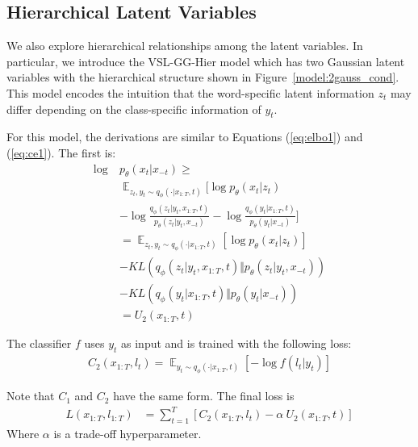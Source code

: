 \documentclass[11pt,a4paper]{article}
\newcommand{\vsmgghier}{VSL-GG-Hier\xspace}
\begin{document}
\subsection{Hierarchical Latent Variables}

We also explore hierarchical relationships among the latent variables.
In particular, we introduce the \vsmgghier model which has two Gaussian latent variables with the  hierarchical structure shown in Figure~\ref{model:2gauss_cond}. This model encodes the intuition that the word-specific latent information $z_t$ may differ depending on the class-specific information of $y_t$.

For this model, the derivations are similar to Equations (\ref{eq:elbo1}) and (\ref{eq:ce1}). The first is:
\begin{equation}
\begin{aligned}
    \log~&p_\theta(x_t\vert x_{-t})\geq\\
    &\mathop\mathbb{E}_{z_t,y_t\sim q_\phi(\cdot\vert x_{1:T},t)}[\log p_\theta(x_t\vert z_t) \\&-\log\frac{q_\phi(z_t\vert y_t,x_{1:T},t)}{p_\theta(z_t\vert y_t,x_{-t})}
    -\log\frac{q_\phi(y_t\vert x_{1:T},t)}{p_\theta(y_t\vert x_{-t})} ]\\
    &=\mathop\mathbb{E}_{z_t,y_t\sim q_\phi(\cdot\vert x_{1:T},t)}[\log p_\theta(x_t\vert z_t)]\\
    &-KL(q_\phi(z_t\vert y_t,x_{1:T},t)\Vert p_\theta(z_t\vert y_t,x_{-t}))\\
    &-KL(q_\phi(y_t\vert x_{1:T},t)\Vert p_\theta(y_t\vert x_{-t}))\\
    &=U_2(x_{1:T},t)
\end{aligned}
\label{eq:elbo2}
\end{equation}

\noindent The classifier $f$ uses $y_t$ as input and is trained with the following loss:
\begin{equation}
\begin{aligned}
C_2(x_{1:T}, l_{t}) = \mathop\mathbb{E}_{y_t\sim q_\phi(\cdot\vert x_{1:T},t)}
[-\log f(l_t\vert y_t)]
\end{aligned}
\label{eq:ce2}
\end{equation}

\noindent Note that $C_1$ and $C_2$ have the same form.
The final loss is
\begin{equation}
\begin{aligned}
L(x_{1:T},l_{1:T}) &= \sum_{t=1}^T[ C_2(x_{1:T}, l_{t}) - \alpha~U_2(x_{1:T}, t)]
\end{aligned}
\end{equation}
Where $\alpha$ is a trade-off hyperparameter.
\end{document}
